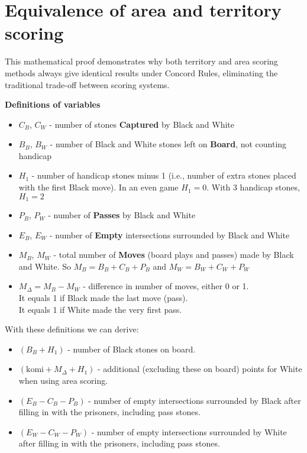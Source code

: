 \documentclass[11pt]{article}
\begin{document}
\newpage
\section*{Equivalence of area and territory scoring}

This mathematical proof demonstrates why both territory and area scoring methods always give identical results under Concord Rules, eliminating the traditional trade-off between scoring systems.

\textbf{Definitions of variables}

\begin{itemize}
\item $C_B$, $C_W$ - number of stones \textbf{Captured} by Black and White
\item $B_B$, $B_W$ - number of Black and White stones left on \textbf{Board}, not counting handicap
\item $H_1$ - number of handicap stones minus 1 (i.e., number of extra stones placed with the first Black move).
In an even game $H_1 = 0$. With 3 handicap stones, $H_1 = 2$
\item $P_B$, $P_W$ - number of \textbf{Passes} by Black and White
\item $E_B$, $E_W$ - number of \textbf{Empty} intersections surrounded by Black and White
\item $M_B$, $M_W$ - total number of \textbf{Moves} (board plays and passes) made by Black and White.
So $M_B = B_B + C_B + P_B$ and $M_W = B_W + C_W + P_W$
\item $M_\Delta = M_B - M_W$ - difference in number of moves, either 0 or 1. \\
It equals 1 if Black made the last move (pass).\\
It equals 1 if White made the very first pass.
\end{itemize}

With these definitions we can derive:
\begin{itemize}
    \item $(B_B+H_1)$ - number of Black stones on board.
    \item $(\text{komi} + M_\Delta + H_1)$ - additional (excluding these on board) points for White when using area scoring.
    \item $(E_B - C_B - P_B)$ - number of empty intersections surrounded by Black after filling in with the prisoners, including pass stones.
    \item $(E_W - C_W - P_W)$ - number of empty intersections surrounded by White after filling in with the prisoners, including pass stones.
\end{itemize}
\end{document}
